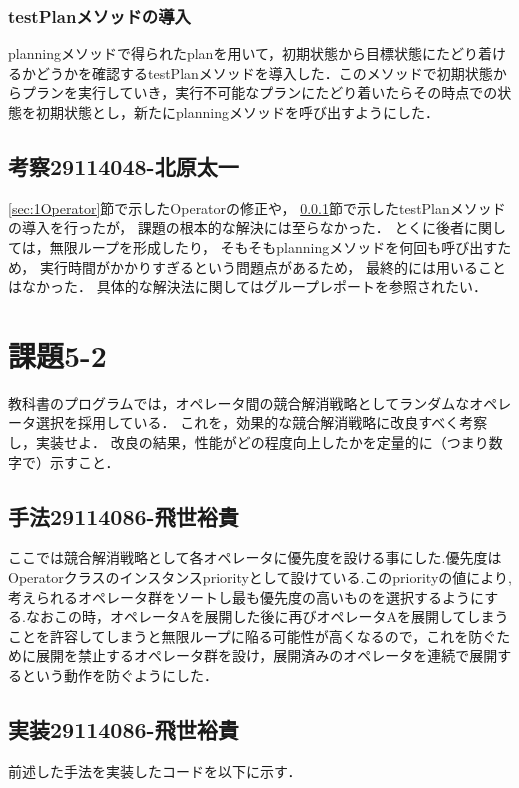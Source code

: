 \documentclass{jarticle}
\begin{document}
\subsubsection{testPlanメソッドの導入}
\label{sec:1Test}
planningメソッドで得られたplanを用いて，初期状態から目標状態にたどり着けるかどうかを確認するtestPlanメソッドを導入した．このメソッドで初期状態からプランを実行していき，実行不可能なプランにたどり着いたらその時点での状態を初期状態とし，新たにplanningメソッドを呼び出すようにした．

\subsection{考察29114048-北原太一}
\ref{sec:1Operator}節で示したOperatorの修正や，
\ref{sec:1Test}節で示したtestPlanメソッドの導入を行ったが，
課題の根本的な解決には至らなかった．
とくに後者に関しては，無限ループを形成したり，
そもそもplanningメソッドを何回も呼び出すため，
実行時間がかかりすぎるという問題点があるため，
最終的には用いることはなかった．
具体的な解決法に関してはグループレポートを参照されたい．


\section{課題5-2}
\begin{screen}
    教科書のプログラムでは，オペレータ間の競合解消戦略としてランダムなオペレータ選択を採用している．
    これを，効果的な競合解消戦略に改良すべく考察し，実装せよ．
    改良の結果，性能がどの程度向上したかを定量的に（つまり数字で）示すこと．
\end{screen}
\subsection{手法29114086-飛世裕貴}
ここでは競合解消戦略として各オペレータに優先度を設ける事にした.優先度はOperatorクラスのインスタンスpriorityとして設けている.このpriorityの値により,考えられるオペレータ群をソートし最も優先度の高いものを選択するようにする.なおこの時，オペレータAを展開した後に再びオペレータAを展開してしまうことを許容してしまうと無限ループに陥る可能性が高くなるので，これを防ぐために展開を禁止するオペレータ群を設け，展開済みのオペレータを連続で展開するという動作を防ぐようにした．

\subsection{実装29114086-飛世裕貴}
前述した手法を実装したコードを以下に示す．
\end{document}
